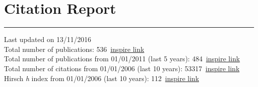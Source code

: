 \documentclass[10pt, a4paper]{article}
\newcommand{\years}[1]{\marginnote{\hskip-0.2in{\scriptsize #1}}}
\begin{document}
\section*{Citation Report}
\vspace{-5pt}
\hrule
\vspace{10pt}
\noindent
Last updated on 13/11/2016\\[1em]
Total number of publications:
536~\href{http://inspirehep.net/search?ln=en&ln=en&p=find+a+santanastasio+and+tc+p+and+date\%3C\%3D2016-11-13&of=hb&action_search=Search&sf=&so=a&rm=&rg=25&sc=0}{inspire
link}\\
Total number of publications from 01/01/2011 (last 5 years): 484~\href{http://inspirehep.net/search?ln=en&ln=en&p=find+a+santanastasio+and+tc+p+and+date\%3C\%3D2016-11-13+and+date\%3E\%3D2011-01-01&of=hb&action_search=Search&sf=&so=a&rm=&rg=25&sc=0}{inspire
link}\\
Total number of citations from 01/01/2006 (last 10 years): 53317~\href{http://inspirehep.net/search?ln=en&ln=en&p=find+a+santanastasio+and+tc+p+and+date\%3E\%3D2006-01-01+and+date\%3C\%3D2016-11-13&of=hcs&action_search=Search&sf=&so=a&rm=&rg=25&sc=0}{inspire
link}\\
Hirsch {\it h} index from 01/01/2006 (last 10 years): 112~\href{http://inspirehep.net/search?ln=en&ln=en&p=find+a+santanastasio+and+tc+p+and+date\%3E\%3D2006-01-01+and+date\%3C\%3D2016-11-13&of=hcs&action_search=Search&sf=&so=a&rm=&rg=25&sc=0}{inspire
link}\\
\end{document}
